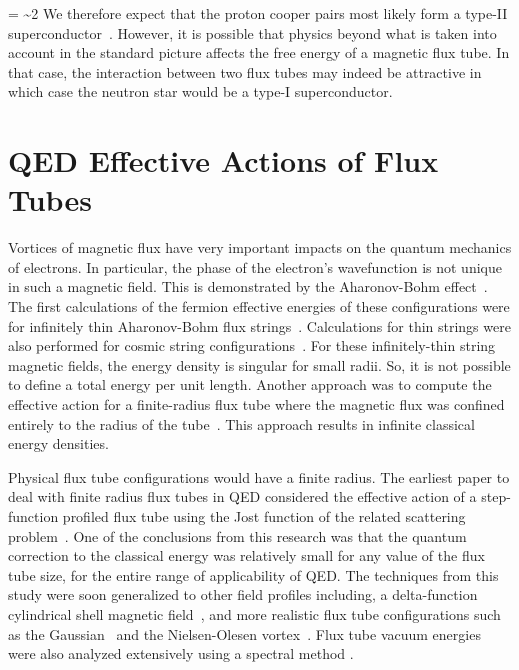 \be
	\kappa =  \sim 2
\ee
We therefore expect that the proton cooper pairs most likely 
form a type-II superconductor~\cite{Sedrakian:2006xm}. 
However, it is possible that 
physics beyond what is taken into account in the standard 
picture affects the free energy of a magnetic flux tube. In 
that case, the interaction between two flux tubes may indeed 
be attractive in which case the neutron star would be a type-I 
superconductor.

\section{\texorpdfstring{\acs{QED}}{QED} Effective Actions of Flux Tubes}
\label{sec:EAisoflux}

Vortices of magnetic flux have very important impacts on the quantum 
mechanics of electrons. In particular, the phase of the electron's wavefunction 
is not unique in such a magnetic field. This is demonstrated by the Aharonov-Bohm
effect~\cite{0370-1301-62-1-303,PhysRev.115.485}. The first calculations of the 
fermion effective energies of these configurations were for infinitely thin Aharonov-Bohm
flux strings~\cite{Gornicki1990271, 1998MPLA...13..379S}. Calculations for thin strings 
were also performed for cosmic string configurations~\cite{0264-9381-12-5-013}. For these 
infinitely-thin string magnetic fields, the energy density is singular for small radii. So, 
it is not possible to define a total energy per unit length. Another approach was to 
compute the effective action for a finite-radius flux tube where the magnetic flux was 
confined entirely to the radius of the tube~\cite{PhysRevD.51.810}. This approach 
results in infinite classical energy densities.

Physical flux tube configurations would have a finite radius.
The earliest paper to deal with finite radius flux tubes in QED considered the effective 
action of a step-function profiled flux tube using the Jost function of the related 
scattering problem~\cite{1999PhRvD..60j5019B}. One of the conclusions from this research 
was that the quantum correction to the classical energy was relatively 
small for any value of the flux tube size, for the entire range of applicability of \ac{QED}. 
The techniques from this study were 
soon generalized to other field profiles including, a delta-function cylindrical shell magnetic 
field~\cite{PhysRevD.62.085024}, and more realistic flux tube configurations 
such as the Gaussian~\cite{2001PhRvD..64j5011P} and the Nielsen-Olesen 
vortex~\cite{2003PhRvD..68f5026B}. 
Flux tube vacuum energies were also analyzed extensively using a spectral method
\cite{2005NuPhB.707..233G, 2006JPhA...39.6799W, Weigel:2010pf}.

